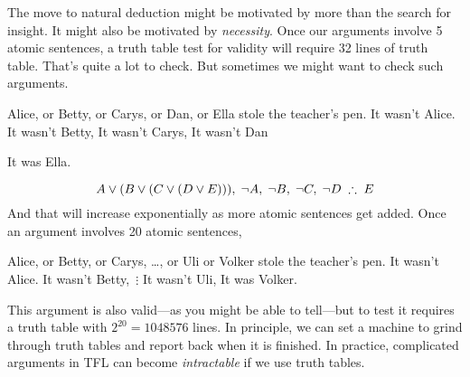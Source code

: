 The move to natural deduction might be motivated by more than the search for insight. It might also be motivated by \emph{necessity}. Once our arguments involve 5 atomic sentences,  a truth table test for validity will require 32 lines of truth table. That's quite a lot to check. But sometimes we might want to check such arguments.
\begin{center}
\begin{earg}
\prem Alice, or Betty, or Carys, or Dan, or Ella stole the teacher's pen.
\prem It wasn't Alice.
\prem It wasn't Betty,
\prem It wasn't Carys,
\prem It wasn't Dan
\item [\therefore] It was Ella.
\end{earg}
\end{center}
$$A\eor(B\eor (C\eor (D\eor E))),\;\enot A,\;\enot B,\;\enot C,\;\enot D\;\therefore\;E$$
And that will increase exponentially as more atomic sentences get added. Once an argument involves 20 atomic sentences,
\begin{center}
\begin{earg}
\prem Alice, or Betty, or Carys, \ldots, or Uli or Volker stole the teacher's pen.
\prem It wasn't Alice.
\prem It wasn't Betty,
\prem\,$\vdots$
\prem It wasn't Uli,
\conc It was Volker.
\end{earg}
\end{center}
This argument is also valid---as you might be able to tell---but to test it requires a truth table with $2^{20} = 1048576$ lines. In principle, we can set a machine to grind through truth tables and report back when it is finished. In practice, complicated arguments in TFL can become \emph{intractable} if we use truth tables.


